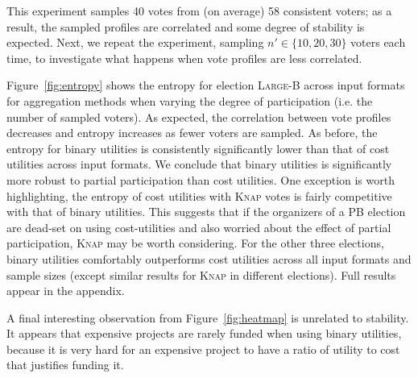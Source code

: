 \documentclass[mnsc,blindrev]{informs3_freeuse} %
\newcommand{\knap}{\textsc{Knap}}
\begin{document}
This experiment samples 40 votes from (on average) 58 consistent voters; as a result,  the sampled profiles are correlated and some degree of stability is expected. Next, we repeat the experiment, sampling $n'\in\{10,20,30\}$ voters each time, to investigate what happens when vote profiles are less correlated. 
%


Figure~\ref{fig:entropy} shows the entropy for election   \textsc{Large-B} across   input formats for aggregation methods when varying the degree of participation (i.e. the number of sampled voters). 
As expected, the correlation between vote profiles decreases and entropy increases  as fewer voters are sampled. 
As before, the entropy for binary utilities is consistently significantly lower than that of cost utilities across input formats. We conclude that binary utilities is significantly more robust to partial participation than cost utilities. One exception is worth highlighting, the entropy of cost utilities with \knap{} votes is fairly competitive with that of binary utilities. This suggests that if the organizers of a PB election are dead-set on using cost-utilities and also worried about the effect of partial participation,  \knap{} may be worth considering. 
%
For the other three elections,   binary utilities comfortably outperforms cost utilities across all input formats and sample sizes (except similar results for \knap{} in different elections). Full results  appear in the appendix. 

A final  interesting observation from  Figure~\ref{fig:heatmap} is unrelated to stability. It appears that expensive projects are  rarely funded  when using binary utilities, because it is very hard for  an expensive project to have a ratio of utility to cost that justifies funding it.
\end{document}
